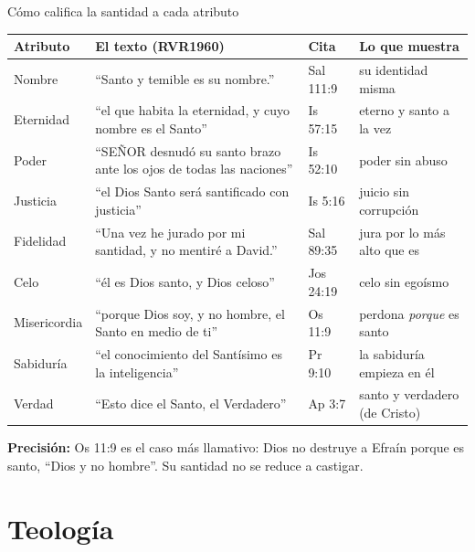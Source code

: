 \documentclass[hyperref={bookmarks=false},aspectratio=169]{beamer}
\newcommand{\SENOR}{S{\fontsize{0.78em}{1em}\selectfont EÑOR}}
\newcommand{\precision}[1]{{\footnotesize\color{gris}\textbf{Precisión:} #1}}
\begin{document}
\begin{frame}{Cómo califica la santidad a cada atributo}
\scriptsize\renewcommand{\arraystretch}{1.22}
\begin{tabular}{@{}>{\RaggedRight\arraybackslash}p{1.8cm}>{\RaggedRight\arraybackslash}p{6.0cm}>{\RaggedRight\arraybackslash}p{1.5cm}>{\RaggedRight\arraybackslash}p{2.3cm}@{}}
\toprule
\textbf{Atributo} & \textbf{El texto (RVR1960)} & \textbf{Cita} & \textbf{Lo que muestra} \\ \midrule
Nombre & ``Santo y temible es su nombre.'' & Sal 111:9 & su identidad misma \\
Eternidad & ``el que habita la eternidad, y cuyo nombre es el Santo'' & Is 57:15 & eterno y santo a la vez \\
Poder & ``\SENOR{} desnudó su santo brazo ante los ojos de todas las naciones'' & Is 52:10 & poder sin abuso \\
Justicia & ``el Dios Santo será santificado con justicia'' & Is 5:16 & juicio sin corrupción \\
Fidelidad & ``Una vez he jurado por mi santidad, y no mentiré a David.'' & Sal 89:35 & jura por lo más alto que es \\
Celo & ``él es Dios santo, y Dios celoso'' & Jos 24:19 & celo sin egoísmo \\
Misericordia & ``porque Dios soy, y no hombre, el Santo en medio de ti'' & Os 11:9 & perdona \emph{porque} es santo \\
Sabiduría & ``el conocimiento del Santísimo es la inteligencia'' & Pr 9:10 & la sabiduría empieza en él \\
Verdad & ``Esto dice el Santo, el Verdadero'' & Ap 3:7 & santo y verdadero (de Cristo) \\
\bottomrule
\end{tabular}\par\smallskip
\precision{Os 11:9 es el caso más llamativo: Dios no destruye a Efraín porque es santo, ``Dios y no hombre''. Su santidad no se reduce a castigar.}
\end{frame}

\section{Teología}
\end{document}
